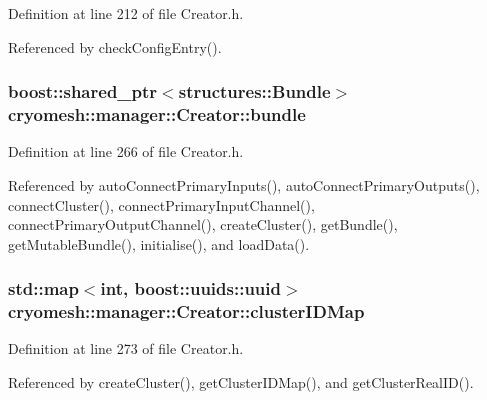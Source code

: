 \-Definition at line 212 of file \-Creator.\-h.



\-Referenced by check\-Config\-Entry().

\hypertarget{classcryomesh_1_1manager_1_1Creator_ace9dd9da21fab7cf04f6681d332d40cc}{
\subsubsection[{bundle}]{\setlength{\rightskip}{0pt plus 5cm}boost\-::shared\-\_\-ptr$<${\bf structures\-::\-Bundle}$>$ {\bf cryomesh\-::manager\-::\-Creator\-::bundle}}}\label{classcryomesh_1_1manager_1_1Creator_ace9dd9da21fab7cf04f6681d332d40cc}


\-Definition at line 266 of file \-Creator.\-h.



\-Referenced by auto\-Connect\-Primary\-Inputs(), auto\-Connect\-Primary\-Outputs(), connect\-Cluster(), connect\-Primary\-Input\-Channel(), connect\-Primary\-Output\-Channel(), create\-Cluster(), get\-Bundle(), get\-Mutable\-Bundle(), initialise(), and load\-Data().

\hypertarget{classcryomesh_1_1manager_1_1Creator_a10123f4421b6231c863d86ebb219b545}{
\subsubsection[{cluster\-I\-D\-Map}]{\setlength{\rightskip}{0pt plus 5cm}std\-::map$<$int, boost\-::uuids\-::uuid$>$ {\bf cryomesh\-::manager\-::\-Creator\-::cluster\-I\-D\-Map}}}\label{classcryomesh_1_1manager_1_1Creator_a10123f4421b6231c863d86ebb219b545}


\-Definition at line 273 of file \-Creator.\-h.



\-Referenced by create\-Cluster(), get\-Cluster\-I\-D\-Map(), and get\-Cluster\-Real\-I\-D().

